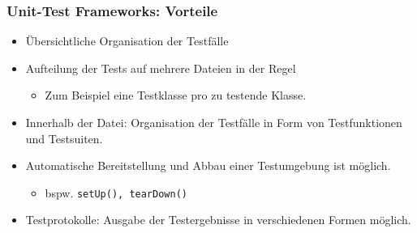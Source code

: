\subsubsection{Unit-Test Frameworks: Vorteile}
\begin{itemize}
	\item Übersichtliche Organisation der Testfälle
	\item Aufteilung der Tests auf mehrere Dateien in der Regel
	\begin{itemize}
		\item Zum Beispiel eine Testklasse pro zu testende Klasse.
	\end{itemize}
	\item Innerhalb der Datei: Organisation der Testfälle in Form von Testfunktionen und Testsuiten.
	\item Automatische Bereitstellung und Abbau einer Testumgebung ist möglich.
	\begin{itemize}
		\item bspw. \texttt{setUp(), tearDown()}
	\end{itemize}
	\item Testprotokolle: Ausgabe der Testergebnisse in verschiedenen Formen möglich. 
\end{itemize}
